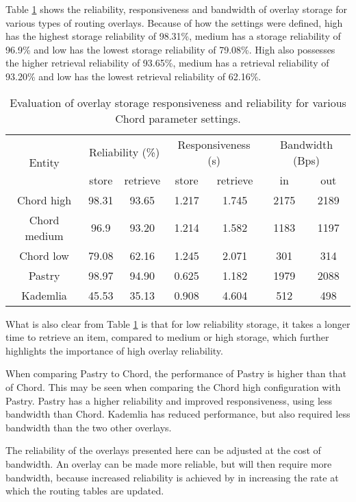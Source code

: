 Table \ref{tab_overlay_rel_resp_results} shows the reliability, responsiveness and bandwidth of overlay storage for various types of routing overlays. Because of how the settings were defined, high has the highest storage reliability of 98.31\%, medium has a storage reliability of 96.9\% and low has the lowest storage reliability of 79.08\%. High also possesses the higher retrieval reliability of 93.65\%, medium has a retrieval reliability of 93.20\% and low has the lowest retrieval reliability of 62.16\%.
%
\begin{table}[htbp]
\centering
\begin{tabular}{|c|c|c|c|c|c|c|}
\hline
\multirow{2}{*}{Entity}       & \multicolumn{2}{c|}{Reliability (\%)}    &\multicolumn{2}{c|}{Responsiveness (s)}& \multicolumn{2}{c|}{Bandwidth (Bps)}\\
\cline{2-7}
             &store & retrieve & store & retrieve     & in & out\\
\hline
Chord high   & 98.31 &93.65 & 1.217&1.745  & 2175&2189 \\
Chord medium & 96.9  &93.20  & 1.214&1.582  & 1183&1197\\
Chord low    & 79.08 &62.16 & 1.245&2.071  & 301 &314\\
Pastry       & 98.97 &94.90 & 0.625&1.182  & 1979&2088\\
Kademlia     & 45.53 &35.13 & 0.908&4.604  & 512 &498\\
\hline
\end{tabular}
\caption{Evaluation of overlay storage responsiveness and reliability for various Chord parameter settings.}
\label{tab_overlay_rel_resp_results}
\end{table}

What is also clear from Table \ref{tab_overlay_rel_resp_results} is that for low reliability storage, it takes a longer time to retrieve an item, compared to medium or high storage, which further highlights the importance of high overlay reliability.

When comparing Pastry to Chord, the performance of Pastry is higher than that of Chord. This may be seen when comparing the Chord high configuration with Pastry. Pastry has a higher reliability and improved responsiveness, using less bandwidth than Chord. Kademlia has reduced performance, but also required less bandwidth than the two other overlays.

The reliability of the overlays presented here can be adjusted at the cost of bandwidth. An overlay can be made more reliable, but will then require more bandwidth, because increased reliability is achieved by in increasing the rate at which the routing tables are updated.


